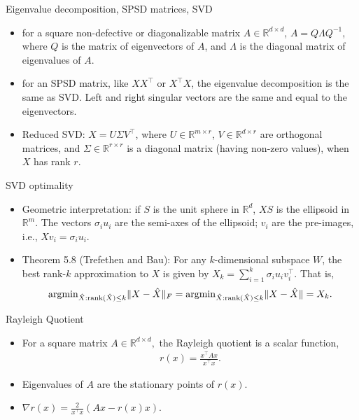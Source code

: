\documentclass[final]{beamer}
\begin{document}
\begin{frame}{Eigenvalue decomposition, SPSD matrices, SVD}
\begin{itemize}
	\item for a square non-defective or diagonalizable matrix $A \in \mathbb{R}^{d\times d}$, $A = Q \Lambda Q^{-1}$, where $Q$ is the matrix of eigenvectors of $A$, and $\Lambda$ is the diagonal matrix of eigenvalues of $A$.
	\pause
	\item for an SPSD matrix, like $X X^\top$ or $X^\top X$, the eigenvalue decomposition is the same as SVD. Left and right singular vectors are the same and equal to the eigenvectors.
	\pause 
\item Reduced SVD: $X = U \Sigma V^\top$, where $U \in \mathbb{R}^{m\times r}$, $V \in \mathbb{R}^{d\times r}$ are orthogonal matrices, and $\Sigma \in \mathbb{R}^{r\times r}$ is a diagonal matrix (having non-zero values), when $X$ has rank $r$.
\end{itemize}
\end{frame}
\begin{frame}{SVD optimality}
	\begin{itemize}
		\item Geometric interpretation: if $S$ is the unit sphere in $\mathbb{R}^d$, $XS$ is the ellipsoid in $\mathbb{R}^m$. The vectors $\sigma_i u_i$ are the semi-axes of the ellipsoid; $v_i$ are the pre-images, i.e., $Xv_i = \sigma_i u_i$.
	\pause
	\item Theorem 5.8 (Trefethen and Bau): For any $k$-dimensional subspace $W$, the best rank-$k$ approximation to $X$ is given by $X_k = \sum_{i=1}^k \sigma_i u_i v_i^\top$. That is, 
	$$ {\rm arg min}_{\hat{X}: {\rm rank}(\hat{X})\leq k } \|X - \hat{X}\|_F =  {\rm arg min}_{\hat{X}: {\rm rank}(\hat{X})\leq k } \|X - \hat{X}\| =  X_k.$$
	\end{itemize}
\end{frame}
\begin{frame}{Rayleigh Quotient}
\begin{itemize}
	\item For a square matrix $A \in \mathbb{R}^{d\times d},$ the Rayleigh quotient is a scalar function,
	\begin{align*}
		r(x) = \frac{x^\top A x}{x^\top x}.
	\end{align*}
	\pause
	\item Eigenvalues of $A$ are the stationary points of $r(x)$.
	\pause
	\item $\nabla r(x) = \frac{2}{x^\top x} (Ax - r(x)x)$.
\end{itemize}
\end{frame}
\end{document}
